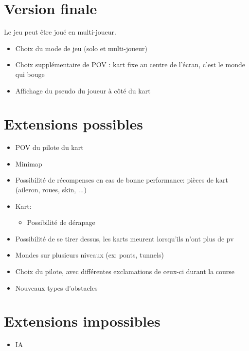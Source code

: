\documentclass{article}
\begin{document}
\section{Version finale}
Le jeu peut être joué en multi-joueur.
\begin{itemize}
    \item Choix du mode de jeu (solo et multi-joueur)
    \item Choix supplémentaire de POV : kart fixe au centre de l'écran, c'est le monde qui bouge
    \item Affichage du pseudo du joueur à côté du kart
\end{itemize}

\section{Extensions possibles}
\begin{itemize}
    \item POV du pilote du kart
    \item Minimap
    \item Possibilité de récompenses en cas de bonne performance: pièces de kart (aileron, roues, skin, ...)
    \item Kart: \begin{itemize}
        \item Possibilité de dérapage
    \end{itemize}
    \item Possibilité de se tirer dessus, les karts meurent lorsqu'ils n'ont plus de pv
    \item Mondes sur plusieurs niveaux (ex: ponts, tunnels)
    \item Choix du pilote, avec différentes exclamations de ceux-ci durant la course
    \item Nouveaux types d'obstacles
\end{itemize}

\section{Extensions impossibles}
\begin{itemize}
    \item IA
\end{itemize}
\end{document}
